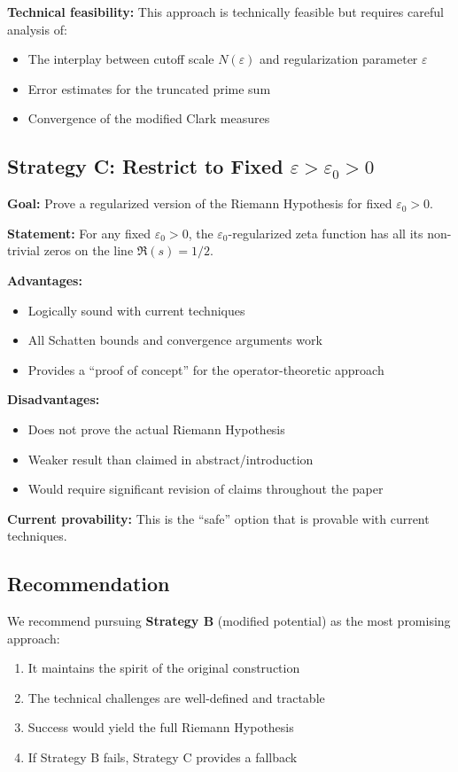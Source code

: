 ﻿\documentclass[12pt,a4paper]{article}
\theoremstyle{definition}
\theoremstyle{remark}
\begin{document}
\textbf{Technical feasibility:} This approach is technically feasible but requires careful analysis of:
\begin{itemize}
\item The interplay between cutoff scale $N(\varepsilon)$ and regularization parameter $\varepsilon$
\item Error estimates for the truncated prime sum
\item Convergence of the modified Clark measures
\end{itemize}

\subsection{Strategy C: Restrict to Fixed $\varepsilon > \varepsilon_0 > 0$}

\textbf{Goal:} Prove a regularized version of the Riemann Hypothesis for fixed $\varepsilon_0 > 0$.

\textbf{Statement:} For any fixed $\varepsilon_0 > 0$, the $\varepsilon_0$-regularized zeta function has all its non-trivial zeros on the line $\Re(s) = 1/2$.

\textbf{Advantages:}
\begin{itemize}
\item Logically sound with current techniques
\item All Schatten bounds and convergence arguments work
\item Provides a ``proof of concept'' for the operator-theoretic approach
\end{itemize}

\textbf{Disadvantages:}
\begin{itemize}
\item Does not prove the actual Riemann Hypothesis
\item Weaker result than claimed in abstract/introduction
\item Would require significant revision of claims throughout the paper
\end{itemize}

\textbf{Current provability:} This is the ``safe'' option that is provable with current techniques.

\subsection{Recommendation}

We recommend pursuing \textbf{Strategy B} (modified potential) as the most promising approach:
\begin{enumerate}
\item It maintains the spirit of the original construction
\item The technical challenges are well-defined and tractable
\item Success would yield the full Riemann Hypothesis
\item If Strategy B fails, Strategy C provides a fallback
\end{enumerate}
\end{document}
